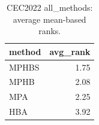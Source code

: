 \begin{table}[t]
\centering
\scriptsize
\caption{CEC2022 all_methods: average mean-based ranks.}
\label{tab:cec2022_all_methods_ranks}
\begin{tabular}{lr}
\toprule
method & avg\_rank \\
\midrule
MPHBS & 1.75 \\
MPHB & 2.08 \\
MPA & 2.25 \\
HBA & 3.92 \\
\bottomrule
\end{tabular}
\end{table}
